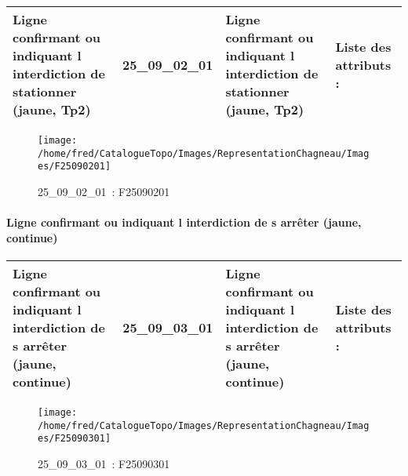 \documentclass[12pt,titlepage,oneside]{book}
\begin{document}
\renewcommand{\arraystretch}{1.2}
\begin{supertabular}{|p{10cm}|c|p{13cm}|p{12cm}|}
 Ligne confirmant ou indiquant l interdiction de stationner (jaune, Tp2) & 25\_09\_02\_01 & Ligne confirmant ou indiquant l interdiction de stationner (jaune, Tp2) & Liste des attributs :
\begin{enumerate}
\end{enumerate}
\\
\hline
\end{supertabular}
\begin{figure}[h!]
  \hfill         %
  \begin{minipage}[t]{3cm}
    \begin{center}
      \texttt{[image: /home/fred/CatalogueTopo/Images/RepresentationChagneau/Images/F25090201]}
      \caption[~25\_09\_02\_01]{\small{25\_09\_02\_01~:} \tiny{F25090201}}\label{F25090201}
    \end{center}
  \end{minipage}
\end{figure}


\paragraph{Ligne confirmant ou indiquant l interdiction de s arrêter (jaune, continue)}
\noindent
\vspace{\baselineskip}

\renewcommand{\arraystretch}{1.2}
\begin{supertabular}{|p{10cm}|c|p{13cm}|p{12cm}|}
 Ligne confirmant ou indiquant l interdiction de s arrêter (jaune, continue) & 25\_09\_03\_01 & Ligne confirmant ou indiquant l interdiction de s arrêter (jaune, continue) & Liste des attributs :
\begin{enumerate}
\end{enumerate}
\\
\hline
\end{supertabular}
\begin{figure}[h!]
  \hfill         %
  \begin{minipage}[t]{3cm}
    \begin{center}
      \texttt{[image: /home/fred/CatalogueTopo/Images/RepresentationChagneau/Images/F25090301]}
      \caption[~25\_09\_03\_01]{\small{25\_09\_03\_01~:} \tiny{F25090301}}\label{F25090301}
    \end{center}
  \end{minipage}
\end{figure}
\end{document}
